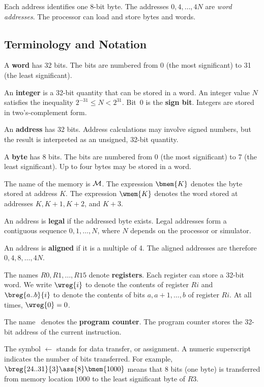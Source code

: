Each address identifies one 8-bit byte. The addresses $0,4,\ldots,4N$
are {\it word addresses\/}. The processor can load and store bytes and
words.

\subsection{Terminology and Notation}

A {\bf word} has 32 bits. The bits are numbered from 0 (the most
significant) to 31 (the least significant).

An {\bf integer} is a 32-bit quantity that can be stored in a word.
An integer value $N$ satisfies the inequality $2^{-31} \le N < 2^{31}$.
Bit~0 is the {\bf sign bit}. Integers are stored in two's-complement
form.

An {\bf address} has 32 bits. Address calculations may involve signed
numbers, but the result is interpreted as an unsigned, 32-bit quantity.

A {\bf byte} has 8 bits. The bits are numbered from 0 (the most
significant) to 7 (the least significant). Up to four bytes may be stored
in a word.

The name of the memory is ${\cal M}$. The expression $\bmem{K}$ denotes
the byte stored at address $K$. The expression $\wmem{K}$ denotes the
word stored at addresses $K,K+1,K+2$, and $K+3$.

An address is {\bf legal} if the addressed byte exists. Legal addresses
form a contiguous sequence $0,1,\ldots,N$, where $N$ depends on the
processor or simulator.

An address is {\bf aligned} if it is a multiple of 4. The aligned
addresses are therefore $0,4,8,\ldots,4N$.

The names $R0,R1,\ldots,R15$ denote {\bf registers}. Each register can
store a 32-bit word. We write $\wreg{i}$ to denote the contents of
register $Ri$ and $\breg{a..b}{i}$ to denote the contents of bits
$a,a+1,\ldots,b$ of register $Ri$. At all times, $\wreg{0}=0$.

The name \ic\ denotes the {\bf program counter}. The program counter
stores the 32-bit address of the current instruction.

The symbol $\longleftarrow$ stands for data transfer, or assignment. A
numeric superscript indicates the number of bits transferred. For
example, $ \breg{24..31}{3} \ass{8} \bmem{1000} $ means that 8 bits (one
byte) is transferred from memory location $1000$ to the least
significant byte of $R3$.

